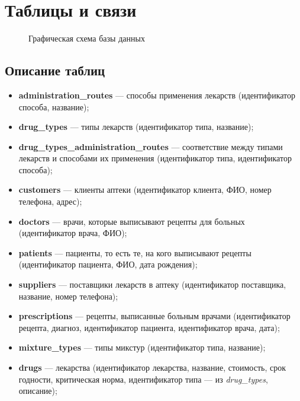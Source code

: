 \documentclass[a4paper]{article}
\newcommand{\dbtable}[1]{\textbf{#1}}
\newcommand{\dbtableref}[1]{\textit{#1}}
\begin{document}
	\section{Таблицы и связи}
		\begin{figure}[H]
			\centering
			\def\svgwidth{\columnwidth}
			
			\caption{\small Графическая схема базы данных}
		\end{figure}
		
		\subsection{Описание таблиц}
			\begin{itemize}
				\item \dbtable{administration\_routes} --- способы применения лекарств (идентификатор способа, название);
				
				\item \dbtable{drug\_types} --- типы лекарств (идентификатор типа, название);
				
				\item \dbtable{drug\_types\_administration\_routes} --- соответствие между типами лекарств и способами их применения (идентификатор типа, идентификатор способа);
				
				\item \dbtable{customers} --- клиенты аптеки (идентификатор клиента, ФИО, номер телефона, адрес);
				
				\item \dbtable{doctors} --- врачи, которые выписывают рецепты для больных (идентификатор врача, ФИО);
				
				\item \dbtable{patients} --- пациенты, то есть те, на кого выписывают рецепты (идентификатор пациента, ФИО, дата рождения);
				
				\item \dbtable{suppliers} --- поставщики лекарств в аптеку (идентификатор поставщика, название, номер телефона);
				
				\item \dbtable{prescriptions} --- рецепты, выписанные больным врачами (идентификатор рецепта, диагноз, идентификатор пациента, идентификатор врача, дата);
				
				\item \dbtable{mixture\_types} --- типы микстур (идентификатор типа, название);
				
				\item \dbtable{drugs} --- лекарства (идентификатор лекарства, название, стоимость, срок годности, критическая норма, идентификатор типа --- из \dbtableref{drug\_types}, описание);
				

\end{itemize}
\end{document}
